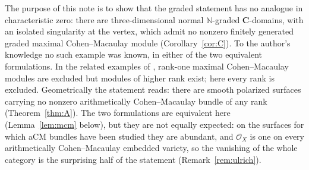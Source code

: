 \documentclass[11pt]{amsart}
\theoremstyle{remark}
\theoremstyle{definition}
\newcommand{\NN}{\mathbb{N}}
\newcommand{\CC}{\mathbf{C}}
\newcommand{\cO}{\mathcal{O}}
\begin{document}
The purpose of this note is to show that the graded statement has no analogue in characteristic zero: there are three-dimensional normal $\NN$-graded $\CC$-domains, with an isolated singularity at the vertex, which admit no nonzero finitely generated graded maximal Cohen--Macaulay module (Corollary~\ref{cor:C}). To the author's knowledge no such example was known, in either of the two equivalent formulations. In the related examples of \cite[Thm.~3.4 and Rem.~3.6]{Ma19}, rank-one maximal Cohen--Macaulay modules are excluded but modules of higher rank exist; here every rank is excluded. Geometrically the statement reads: there are smooth polarized surfaces carrying no nonzero arithmetically Cohen--Macaulay bundle of any rank (Theorem~\ref{thm:A}). The two formulations are equivalent here (Lemma~\ref{lem:mcm} below), but they are not equally expected: on the surfaces for which aCM bundles have been studied they are abundant, and $\cO_X$ is one on every arithmetically Cohen--Macaulay embedded variety, so the vanishing of the whole category is the surprising half of the statement (Remark~\ref{rem:ulrich}).
\end{document}
